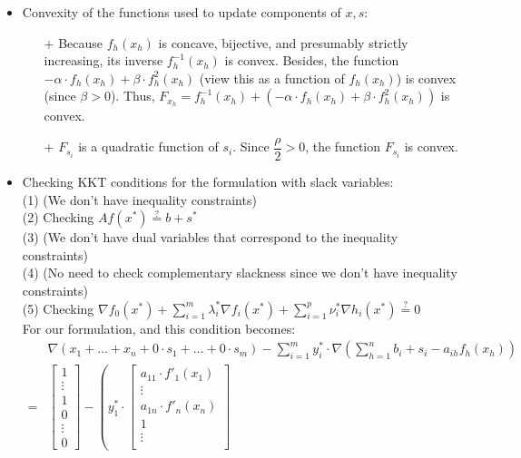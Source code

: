 \documentclass{article}
\begin{document}
\begin{itemize}
\item Convexity of the functions used to update components of $x, s$: 
\begin{itemize}
    \item[+] Because $f_h(x_h)$ is concave, bijective, and presumably strictly increasing, its inverse $f_h^{-1}(x_h)$ is convex. Besides, the function $-\alpha\cdot f_h(x_h) + \beta\cdot f_h^2(x_h)$ (view this as a function of $f_h(x_h)$) is convex (since $\beta>0$). Thus, $F_{x_h} = f_h^{-1}(x_h) + (-\alpha\cdot f_h(x_h) + \beta\cdot f_h^2(x_h))$ is convex.
    \item[+] $F_{s_i}$ is a quadratic function of $s_i$. Since $\dfrac{\rho}{2} > 0$, the function $F_{s_i}$ is convex. 
\end{itemize}
\item Checking KKT conditions for the formulation with slack variables:\\
(1) (We don't have inequality constraints) \\
(2) Checking $Af(x^*) \stackrel{?}{=} b + s^*$\\
(3) (We don't have dual variables that correspond to the inequality constraints)\\
(4) (No need to check complementary slackness since we don't have inequality constraints)\\
(5) Checking $\nabla f_0(x^*) + \sum\limits_{i=1}^m \lambda_i^* \nabla f_i(x^*) + \sum\limits_{i=1}^p \nu_i^* \nabla h_i(x^*) \stackrel{?}{=} 0$\\
For our formulation, and this condition becomes: \\
\begin{align*}
& \nabla (x_1 + \ldots + x_n + 0\cdot s_1 + \ldots + 0 \cdot s_m) - \sum\limits_{i=1}^m y_i^* \cdot \nabla \left(\sum\limits_{h=1}^n b_i+s_i-a_{ih} f_h(x_h) \right)  \\
= & \begin{bmatrix}
1 \\
\vdots\\
1\\
0\\
\vdots\\
0
\end{bmatrix}
-  \left( y_1^* \cdot 
\begin{bmatrix}
a_{11}\cdot f'_1(x_1) \\
\vdots\\
a_{1n} \cdot f'_n(x_n)\\
1\\
\vdots\\

\end{bmatrix}
\end{align*}
\end{itemize}
\end{document}
